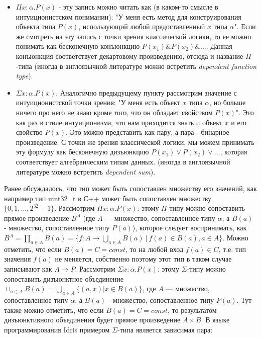 \begin{itemize}
    \item $\Pi x : \alpha . P(x)$ - эту запись можно читать как (в каком-то смысле в интуиционистском понимании): "У меня есть метод для конструирования объекта типа $P(x)$, использующий любой предоставленный $x$ типа $\alpha$". Если же смотреть на эту запись с точки зрения классической логики, то ее можно понимать как бесконечную  конъюнкцию $P(x_1)\&P(x_2)\&...$. Данная конъюнкция соответствует декартовому произведению, отсюда и название $\Pi$-типа (иногда в англоязычной литературе можно встретить \textit{dependent function type}).
    \item $\Sigma x : \alpha . P(x)$. Аналогично предыдущему пункту рассмотрим значение с интуиционистской точки зрения: "У меня есть объект $x$ типа $\alpha$, но больше ничего про него не знаю кроме того, что он обладает свойством $P(x)$". Это как раз в стиле интуиционизма, что нам приходится знать и объект $x$ и его свойство $P(x)$. Это можно представить как пару, а пара - бинарное произведение. С точки же зрения классической логики, мы можем принимать эту формулу как бесконечную дизъюнкцию $P(x_1) \vee P(x_2)\vee ...$, которая соответствует алгебраическим типам данных. (иногда в англоязычной литературе можно встретить \textit{dependent sum}).
\end{itemize}

Ранее обсуждалось, что тип может быть сопоставлен множеству его значений, как например тип uint32\_t в С++ может быть сопоставлен множеству $\{0, 1, ..., 2^{32} - 1\}$. Рассмотрим $\Pi x : \alpha . P(x)$: этому $\Pi$-типу можно сопоставить прямое произведение $B^A$ (где $A$ --- множество, сопоставленное типу $\alpha$, а $B(a)$ - множество, сопоставленное типу $P(a)$), которое следует воспринимать, как $B^A = \prod_{a \in A} B(a) = \{ f : A \rightarrow \bigcup_{a \in A} B(a)\ |\ f(a) \in B(a), a \in A  \}$. Можно отметить, что если $B(a) = C = const$, то на любой вход $f(a) \in C$, т.е. тип значения $f(a)$ не меняется, собственно поэтому этот тип в таком случае записывают как $A \rightarrow P$. Рассмотрим $\Sigma x : \alpha . P(x)$: этому $\Sigma$-типу можно сопоставить дизъюнктное объединение $\sqcup_{a \in A} B(a) = \bigcup_{a \in A}\{(a, x) | x \in B(a)\}$, где $A$ --- множество, сопоставленное типу $\alpha$, а $B(a)$ - множество, сопоставленное типу $P(a)$. Тут также можно отметить, что если $B(a) = C = const$, то результатом дизъюнктивного объединения будет прямое произведение $A \times B$. В языке программирования Idris примером $\Sigma$-типа является зависимая пара:

